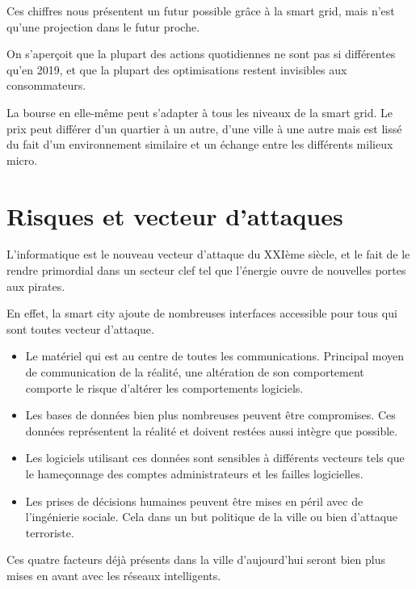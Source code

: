 Ces chiffres nous présentent un futur possible grâce à la smart grid, mais n'est qu'une projection dans le futur proche.

On s'aperçoit que la plupart des actions quotidiennes ne sont pas si différentes qu'en 2019, et que la plupart des
optimisations restent invisibles aux consommateurs.

La bourse en elle-même peut s'adapter à tous les niveaux de la smart grid. Le prix peut différer d'un quartier à un autre,
d'une ville à une autre mais est lissé du fait d'un environnement similaire et un échange entre les différents milieux micro.

\section{Risques et vecteur d'attaques}

L'informatique est le nouveau vecteur d'attaque du XXIème siècle, et le fait de le rendre primordial
dans un secteur clef tel que l'énergie ouvre de nouvelles portes aux pirates.

En effet, la smart city ajoute de nombreuses interfaces accessible pour tous qui sont toutes
vecteur d'attaque.


\begin{itemize}
  \item Le matériel qui est au centre de toutes les communications.
        Principal moyen de communication de la réalité, une altération de son
        comportement comporte le risque d'altérer les comportements logiciels.
  \item Les bases de données bien plus nombreuses peuvent être compromises.
        Ces données représentent la réalité et doivent restées aussi intègre que possible.
  \item Les logiciels utilisant ces données sont sensibles à différents vecteurs tels que le
        hameçonnage des comptes administrateurs et les failles logicielles.
  \item Les prises de décisions humaines peuvent être mises en péril avec de l'ingénierie sociale.
        Cela dans un but politique de la ville ou bien d'attaque terroriste.
\end{itemize}

Ces quatre facteurs déjà présents dans la ville d'aujourd'hui seront bien plus mises en avant avec
les réseaux intelligents.
